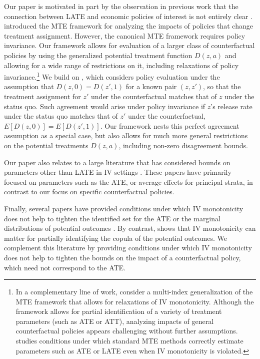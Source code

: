 \documentclass[12pt]{article}%
\theoremstyle{definition}
\newcommand\1{\operatorname{I}\indicatorfence}
\begin{document}
Our paper is motivated in part by the observation in previous work that the
connection between \ac{LATE} and economic policies of interest is not entirely
clear \parencite[e.g.][]{HeVy05,HeVy07i,manski1996jhr,manskiJPEMicro}.
\Textcite{HeVy99,HeVy05} introduced the \ac{MTE} framework for analyzing the
impacts of policies that change treatment assignment. However, the canonical
\ac{MTE} framework requires policy invariance. Our framework allows for
evaluation of a larger class of counterfactual policies by using the
generalized potential treatment function $D(z, a)$ and allowing for a wide range
of restrictions on it, including relaxations of policy invariance.\footnote{In a
  complementary line of work, \textcite{ura_policy_2025} consider a multi-index
  generalization of the MTE framework that allows for relaxations of IV
  monotonicity. Although the framework allows for partial identification of a
  variety of treatment parameters (such as ATE or ATT), analyzing impacts of
  general counterfactual policies appears challenging without further
  assumptions. \Textcite{sigstad_marginal_2024} studies conditions under which
  standard MTE methods correctly estimate parameters such as ATE or LATE even
  when \ac{IV} monotonicity is violated.} We build on \textcite{IcTa00}, which
considers policy evaluation under the assumption that $D(z,0) =D(z',1)$ for a known pair $(z,z')$, so that the treatment assignment for $z'$ under the counterfactual matches that of $z$ under the status quo. Such agreement would arise under policy invariance if $z$'s release rate under the status quo matches that of $z'$ under the counterfactual, $E[D(z,0)]=E[D(z',1)]$. Our framework nests this perfect agreement assumption
as a special case, but also allows for much more general restrictions on the
potential treatments $D(z,a)$, including non-zero disagreement bounds.
%
%
%
%
%

Our paper also relates to a large
literature that has considered bounds on parameters other than LATE in \ac{IV}
settings \parencite[e.g.][]{BaPe97,manski_nonparametric_1990,
  swanson_partial_2018, bai_inference_2025, chen_bounds_2015, RiRo14}. These
papers have primarily focused on parameters such as the \ac{ATE}, or average
effects for principal strata, in contrast to our focus on specific
counterfactual policies.

%
%
%
%
%
%
%
%
%
%
%
%
%
%

Finally, several papers have provided conditions under which \ac{IV}
monotonicity does not help to tighten the identified set for the \ac{ATE} or the
marginal distributions of potential outcomes
\parencite{BaPe97,kitagawa21,HeVy01bounds,bai_identifying_2024}. By contrast,
\textcite{kamat_identifying_2019} shows that IV monotonicity can matter for
partially identifying the copula of the potential outcomes. We complement this literature by providing conditions under which IV monotonicity does not help to tighten the bounds on the impact of a counterfactual policy, which need not correspond to the \ac{ATE}.
\end{document}
